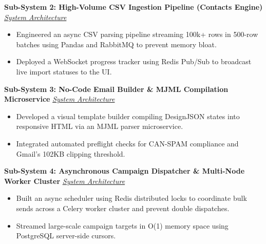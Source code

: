 \documentclass[10pt,a4paper]{article}
\begin{document}
\vspace{3pt}

\noindent\textbf{Sub-System 2: High-Volume CSV Ingestion Pipeline (Contacts Engine)} \hfill \href{https://github.com/Rahul-pamula/ShrFlow-V1/blob/main/docs/projects/2_csv_ingestion.md}{\small\textit{System Architecture}}
\begin{itemize}[leftmargin=1.2em, topsep=1pt, itemsep=1pt, parsep=0pt, partopsep=0pt]
    \item Engineered an async CSV parsing pipeline streaming 100k+ rows in 500-row batches using Pandas and RabbitMQ to prevent memory bloat.
    \item Deployed a WebSocket progress tracker using Redis Pub/Sub to broadcast live import statuses to the UI.
\end{itemize}

\vspace{3pt}

\noindent\textbf{Sub-System 3: No-Code Email Builder \& MJML Compilation Microservice} \hfill \href{https://github.com/Rahul-pamula/ShrFlow-V1/blob/main/docs/projects/3_email_builder.md}{\small\textit{System Architecture}}
\begin{itemize}[leftmargin=1.2em, topsep=1pt, itemsep=1pt, parsep=0pt, partopsep=0pt]
    \item Developed a visual template builder compiling DesignJSON states into responsive HTML via an MJML parser microservice.
    \item Integrated automated preflight checks for CAN-SPAM compliance and Gmail's 102KB clipping threshold.
\end{itemize}

\vspace{3pt}

\noindent\textbf{Sub-System 4: Asynchronous Campaign Dispatcher \& Multi-Node Worker Cluster} \hfill \href{https://github.com/Rahul-pamula/ShrFlow-V1/blob/main/docs/projects/4_campaign_dispatcher.md}{\small\textit{System Architecture}}
\begin{itemize}[leftmargin=1.2em, topsep=1pt, itemsep=1pt, parsep=0pt, partopsep=0pt]
    \item Built an async scheduler using Redis distributed locks to coordinate bulk sends across a Celery worker cluster and prevent double dispatches.
    \item Streamed large-scale campaign targets in O(1) memory space using PostgreSQL server-side cursors.
\end{itemize}
\end{document}
